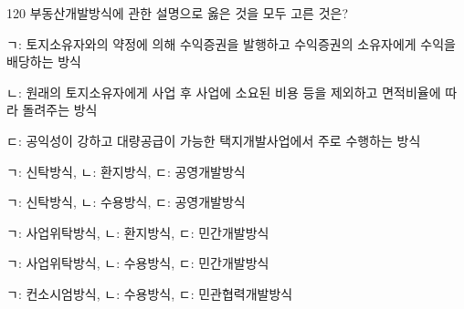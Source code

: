 \begin{question}{120}
부동산개발방식에 관한 설명으로 옳은 것을 모두 고른 것은?
\begin{framedtext}
ㄱ: 토지소유자와의 약정에 의해 수익증권을 발행하고 수익증권의 소유자에게 수익을 배당하는 방식 \par
ㄴ: 원래의 토지소유자에게 사업 후 사업에 소요된 비용 등을 제외하고 면적비율에 따라 돌려주는 방식 \par
ㄷ: 공익성이 강하고 대량공급이 가능한 택지개발사업에서 주로 수행하는 방식 \par
\end{framedtext}
\begin{choices}
  \item ㄱ: 신탁방식, ㄴ: 환지방식, ㄷ: 공영개발방식
  \item ㄱ: 신탁방식, ㄴ: 수용방식, ㄷ: 공영개발방식
  \item ㄱ: 사업위탁방식, ㄴ: 환지방식, ㄷ: 민간개발방식
  \item ㄱ: 사업위탁방식, ㄴ: 수용방식, ㄷ: 민간개발방식
  \item ㄱ: 컨소시엄방식, ㄴ: 수용방식, ㄷ: 민관협력개발방식
\end{choices}
\end{question}
